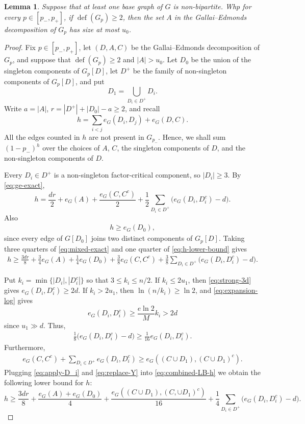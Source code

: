 \documentclass[notitlepage]{scrartcl}
\newtheorem{lemma}[thm]{Lemma}
\newcommand{\defi}{\operatorname{def}}
\begin{document}
\begin{lemma}\label{lem:nonbipartite-ge}
Suppose that at least one base graph of $G$ is non-bipartite.
Whp for every $p\in[p_-,p_+]$, if $\defi(G_p)\ge2$, then the set $A$ in the Gallai--Edmonds decomposition of $G_p$ has size at most $u_0$.
\end{lemma}
\begin{proof}
Fix $p\in[p_-,p_+]$, let $(D,A,C)$ be the Gallai--Edmonds decomposition of $G_p$, and suppose that $\defi(G_p)\ge2$ and $|A|>u_0$.
Let $D_0$ be the union of the singleton components of $G_p[D]$, let $D^+$ be the family of non-singleton components of $G_p[D]$, and put
\[
 D_1=\bigcup_{D_i \in D^+} D_i.
\]
Write $a=|A|$, $r=|D^+|+|D_0|-a\ge2$, and recall
\[
 h=\sum_{i<j}e_G(D_i,D_j)+e_G(D,C).
\]
All the edges counted in $h$ are not present in $G_{p_-}$.
Hence, we shall sum $(1-p_-)^h$ over the choices of $A$, $C$, the singleton components of $D$, and the non-singleton components of $D$.

Every $D_i\in D^+$ is a non-singleton factor-critical component, so $|D_i|\ge3$.
By \eqref{eq:ge-exact},
\begin{equation}\label{eq:mixed-exact}
 h=\frac{dr}{2}+e_G(A)+\frac{e_G(C, C^c)}{2}
   +\frac{1}{2}\sum_{D_i\in D^+}\bigl(e_G(D_i, D_i^c)-d\bigr).
\end{equation}
Also 
\begin{align} \label{eq:h-lower-bound}
    h\ge e_G(D_0),
\end{align}
since every edge of $G[D_0]$ joins two distinct components of $G_p[D]$.
Taking three quarters of \eqref{eq:mixed-exact} and one quarter of \eqref{eq:h-lower-bound} gives
\begin{align} \label{eq:combined-LB-h}
     h\ge\frac{3dr}{8}+\frac34e_G(A)+\frac14e_G(D_0)  +\frac38 e_G(C, C^c)
 +\frac38\sum_{D_i\in D^+}\bigl(e_G(D_i, D_i^c)-d\bigr).
\end{align}

Put $k_i=\min\{|D_i|,|D_i^c|\}$ so that $3\le k_i\le n/2$.
If $k_i\le2u_1$, then \eqref{eq:strong-3d} gives $e_G(D_i, D_i^c)\ge2d$.
If $k_i>2u_1$, then $\ln(n/k_i)\ge\ln 2$, and \eqref{eq:expansion-log} gives
\[
 e_G(D_i, D_i^c)\ge\frac{e\ln 2}{M}k_i>2d
\]
since $u_1\gg d$. Thus,
\begin{align} \label{eq:apply-D_i}
    \frac18\bigl(e_G(D_i, D_i^c)-d\bigr)\ge\frac1{16}e_G(D_i, D_i^c).
\end{align}
Furthermore, 
 \begin{align} \label{eq:replace-Y}
     e_G(C, C^c)+\sum_{D_i\in D^+}e_G(D_i, D_i^c) \geq e_G((C \cup D_1), (C \cup D_1)^c).
 \end{align}
Plugging \eqref{eq:apply-D_i} and \eqref{eq:replace-Y} into \eqref{eq:combined-LB-h} we obtain the following lower bound for $h$:
\begin{equation}\label{eq:mixed-master}
 h\ge\frac{3dr}{8}
 +\frac{e_G(A)+e_G(D_0)}4
 +\frac{e_G((C \cup D_1), (C, \cup D_1)^c)}{16}
 +\frac14\sum_{D_i \in D^+}\bigl(e_G(D_i, D_i^c)-d\bigr).
\end{equation}


\end{proof}
\end{document}
